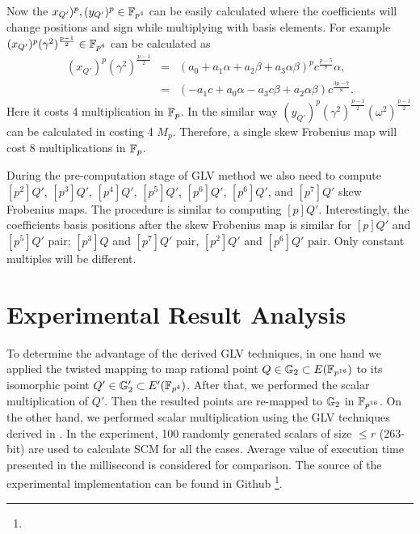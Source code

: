 Now the $x_{Q'})^p, (y_{Q'})^p \in \mathbb{F}_{p^4}$ can be easily calculated where the coefficients will change positions and sign while multiplying with basis elements. For example  $ (x_{Q'})^p (\gamma^2)^{\frac{p-1}{2}} \in \mathbb{F}_{p^4}$ can be calculated as 
\begin{eqnarray}
(x_{Q'})^p (\gamma^2)^{\frac{p-1}{2}} &=& (a_0+a_1\alpha+a_2\beta+a_3 \alpha\beta)^p c^{\frac{p-5}{8}}\alpha, \nonumber \\
& = & ( -a_1c + a_0 \alpha -a_3c \beta +a_2\alpha \beta) c^{\frac{3p-7}{8}}. \nonumber
\end{eqnarray} 
Here it costs 4 multiplication in ${\mathbb{F}}_{p}$.
In the similar way $(y_{Q'})^p (\gamma^2)^{\frac{p-1}{2}} (\omega^2)^{\frac{p-1}{2}}$ can be calculated in costing 4 $M_p$.
Therefore, a single skew Frobenius map will cost 8 multiplications in ${\mathbb{F}}_{p}$.

During the pre-computation stage of GLV method we also need to compute $[p^2]Q'$, $[p^3]Q'$, $[p^4]Q'$, $[p^5]Q'$, $[p^6]Q'$, $[p^6]Q'$, and $[p^7]Q'$ skew Frobenius maps. 
The procedure is similar to computing $[p]Q'$.
Interestingly, the coefficients basis positions after the skew Frobenius map is similar for $[p]Q'$ and  $[p^5]Q'$ pair; $[p^3]Q$ and $[p^7]Q'$ pair, $[p^2]Q'$ and $[p^6]Q'$ pair.
Only constant multiples will be different.  


\section{Experimental Result Analysis}
To determine the advantage of the derived GLV techniques, in one hand we applied the twisted mapping to map rational point $Q \in {\mathbb{G}}_{2} \subset E({\mathbb{F}}_{p^{16}})$ to its isomorphic point $Q' \in {\mathbb{G}}_{2}' \subset E'({\mathbb{F}}_{p^{4}})$. 
After that, we performed the scalar multiplication of $Q'$. Then the resulted points are re-mapped to ${\mathbb{G}}_{2}$ in $\mathbb{F}_{p^{16}}$.
On the other hand, we performed scalar multiplication using the GLV techniques derived in .
In the experiment, 100 randomly generated scalars of size $\leq r$ (263-bit) are used to calculate SCM for all the cases.
Average value of execution time presented in the millisecond is considered for comparison.
The source of the experimental implementation can be found in Github \footnote{\footurl}.

